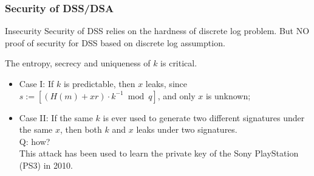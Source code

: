 \begin{comment}
\[r = [[g^k \bmod p] \bmod q]\; \text{and}\; s= [(\hat{m}+xr)\cdot k^{-1} \bmod q],\; \hat{m}=H(m). \]
\begin{align*}g^{\hat{m}s^{-1}}y^{rs^{-1}} &= g^{\hat{m}\cdot (\hat{m}+xr)^{-1}k}g^{xr\cdot (\hat{m}+xr)^{-1}k} \pmod p \\
	&= g^{(\hat{m}+xr)\cdot (\hat{m}+xr)^{-1}k} \pmod p \\  
	&= g^k \pmod p.
	\end{align*}
\[ [[g^k \bmod p] \bmod q] = r.\]
\end{comment}


\begin{frame}\frametitle{Security of DSS/DSA}
\begin{alertblock}{Insecurity}
Security of DSS relies on the hardness of discrete log problem. But NO proof of security for DSS based on discrete log assumption.
\end{alertblock}

\begin{exampleblock}{The entropy, secrecy and uniqueness of $k$ is critical.}
\begin{itemize}
\item Case I: If $k$ is predictable, then $x$ leaks, since $s:= [(H(m)+xr)\cdot k^{-1} \bmod q]$, and only $x$ is unknown;
\item Case II: If the same $k$ is ever used to generate two different signatures under the same $x$, then both $k$ and $x$ leaks under two signatures.\\
\alert{Q: how?} \\

This attack has been used to learn the private key of the Sony PlayStation (PS3) in 2010.
\end{itemize}
\end{exampleblock}
\end{frame}

